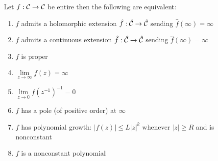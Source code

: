 \documentclass[12pt]{article}
\begin{document}
\begin{prop}
Let $f : \mathcal{C} \to \mathcal{C}$ be entire then the following are equivalent:
\begin{enumerate}
\item $f$ admits a holomorphic extension $\hat{f} : \hat{\mathcal{C}} \to \hat{\mathcal{C}}$ sending $\hat{f}(\infty) = \infty$
\item $f$ admits a continuous extension $\hat{f} : \hat{\mathcal{C}} \to \hat{\mathcal{C}}$ sending $\hat{f}(\infty) = \infty$
\item $f$ is proper
\item $\lim\limits_{z \to \infty} f(z) = \infty$
\item $\lim\limits_{z \to 0} f(z^{-1})^{-1} = 0$
\item $f$ has a pole (of positive order) at $\infty$
\item $f$ has polynomial growth: $|f(z)| \le L |z|^k$ whenever $|z| \ge R$ and is nonconstant
\item $f$ is a nonconstant polynomial
\end{enumerate}
\end{prop}
\end{document}
